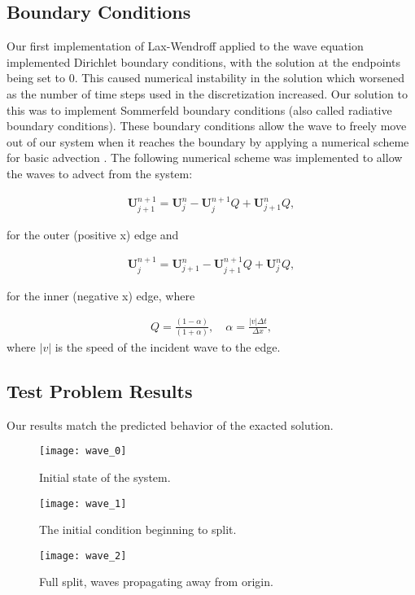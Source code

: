 \documentclass[../main.tex]{subfiles}
\begin{document}
\subsection{Boundary Conditions}

Our first implementation of Lax-Wendroff applied to the wave equation implemented Dirichlet boundary conditions, with the solution at the endpoints being set to $0$. This caused numerical instability in the solution which worsened as the number of time steps used in the discretization increased. Our solution to this was to implement Sommerfeld boundary conditions (also called radiative boundary conditions). These boundary conditions allow the wave to freely move out of our system when it reaches the boundary by applying a numerical scheme for basic advection \cite{rezzolla}. The following numerical scheme was implemented to allow the waves to advect from the system:

\begin{gather*}
	\mathbf{U}^{n+1}_{j+1} = \mathbf{U}^n_j - \mathbf{U}^{n+1}_jQ+\mathbf{U}^n_{j+1}Q,	
\end{gather*}

\noindent for the outer (positive x) edge and 

\begin{gather*}
	\mathbf{U}^{n+1}_j = \mathbf{U}^n_{j+1}-\mathbf{U}^{n+1}_{j+1}Q+\mathbf{U}^n_jQ,
\end{gather*}

\noindent for the inner (negative x) edge, where 

\begin{gather*}
	Q = \frac{(1-\alpha)}{(1+\alpha)},\quad \alpha=\frac{|v|\Delta t}{\Delta x},
\end{gather*}
where $|v|$ is the speed of the incident wave to the edge.

\subsection{Test Problem Results}
Our results match the predicted behavior of the exacted solution.

\begin{figure}[H]
    \centering
    \texttt{[image: wave\_0]}
    \caption{Initial state of the system.}
    \label{fig:wave0}
\end{figure}

\begin{figure}[H]
    \centering
    \texttt{[image: wave\_1]}
    \caption{The initial condition beginning to split.}
    \label{fig:wave1}
\end{figure}

\begin{figure}[H]
    \centering
    \texttt{[image: wave\_2]}
    \caption{Full split, waves propagating away from origin.}
    \label{fig:wave2}
\end{figure}
\end{document}
